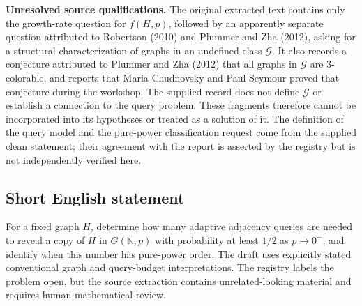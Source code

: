 \documentclass[11pt]{article}
\newcommand{\N}{\mathbb{N}}
\begin{document}
\textbf{Unresolved source qualifications.} The original extracted text contains only the growth-rate question for \(f(H,p)\), followed by an apparently separate question attributed to Robertson (2010) and Plummer and Zha (2012), asking for a structural characterization of graphs in an undefined class \(\mathcal G\). It also records a conjecture attributed to Plummer and Zha (2012) that all graphs in \(\mathcal G\) are \(3\)-colorable, and reports that Maria Chudnovsky and Paul Seymour proved that conjecture during the workshop. The supplied record does not define \(\mathcal G\) or establish a connection to the query problem. These fragments therefore cannot be incorporated into its hypotheses or treated as a solution of it. The definition of the query model and the pure-power classification request come from the supplied clean statement; their agreement with the report is asserted by the registry but is not independently verified here.
\subsection{Short English statement}
For a fixed graph \(H\), determine how many adaptive adjacency queries are needed to reveal a copy of \(H\) in \(G(\N,p)\) with probability at least \(1/2\) as \(p\to0^+\), and identify when this number has pure-power order. The draft uses explicitly stated conventional graph and query-budget interpretations. The registry labels the problem open, but the source extraction contains unrelated-looking material and requires human mathematical review.
\end{document}
